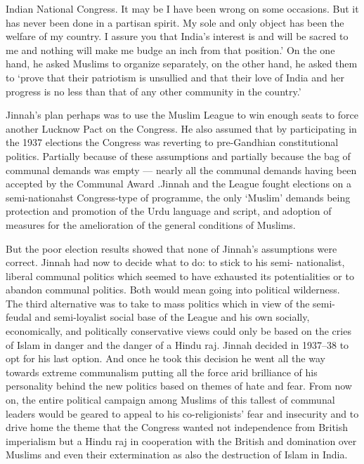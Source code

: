 \begin{multicols}{2}
Indian National Congress. It may be I have been wrong on some occasions. But it has never been done in a partisan spirit. My sole and only object has been the welfare of my country. I assure you that India's interest is and will be sacred to me and nothing will make me budge an inch from that position.' On the one hand, he asked Muslims to organize separately, on the other hand, he asked them to `prove that their patriotism is unsullied and that their love of India and her progress is no less than that of any other community in the country.' 

Jinnah's plan perhaps was to use the Muslim League to win enough seats to force another Lucknow Pact on the Congress. He also assumed that by participating in the 1937 elections the Congress was reverting to pre-Gandhian constitutional politics. Partially because of these assumptions and partially because the bag of communal demands was empty --- nearly all the communal demands having been accepted by the Communal Award .Jinnah and the League fought elections on a semi-nationahst Congress-type of programme, the only `Muslim' demands being protection and promotion of the Urdu language and script, and adoption of measures for the amelioration of the general conditions of Muslims. 

But the poor election results showed that none of Jinnah's assumptions were correct. Jinnah had now to decide what to do: to stick to his semi- nationalist, liberal communal politics which seemed to have exhausted its potentialities or to abandon communal politics. Both would mean going into political wilderness. The third alternative was to take to mass politics which in view of the semi-feudal and semi-loyalist social base of the League and his own socially, economically, and politically conservative views could only be based on the cries of Islam in danger and the danger of a Hindu raj. Jinnah decided in 1937--38 to opt for his last option. And once he took this decision he went all the way towards extreme communalism putting all the force arid brilliance of his personality behind the new politics based on themes of hate and fear. From now on, the entire political campaign among Muslims of this tallest of communal leaders would be geared to appeal to his co-religionists' fear and insecurity and to drive home the theme that the Congress wanted not independence from British imperialism but a Hindu raj in cooperation with the British and domination over Muslims and even their extermination as also the destruction of Islam in India. 


\end{multicols}
